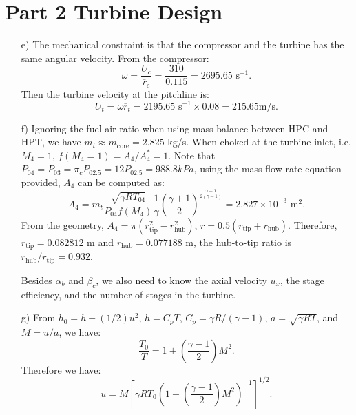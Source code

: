 \documentclass[12pt]{article}
\begin{document}
\section{Part 2 Turbine Design}
\begin{itemize}
	\item[e)]
	The mechanical constraint is that the compressor and the turbine has the same angular velocity. From the compressor:
	\begin{equation}
		\omega = \frac{U_c}{\overline{r}_c} = \frac{310}{0.115} = 2695.65\text{ s}^{-1}.
	\end{equation}
	Then the turbine velocity at the pitchline is:
	\begin{equation}
		U_t = \omega \overline{r}_t = 2195.65\text{ s}^{-1}\times 0.08 = 215.65\text{m/s}.
	\end{equation}
	
	\item[f)]
	Ignoring the fuel-air ratio when using mass balance between HPC and HPT, we have $\dot{m}_t \approx \dot{m}_\text{core}=2.825$ kg/s. When choked at the turbine inlet, i.e. $M_4 = 1$, $f(M_4=1)=A_4/A^*_4=1$. Note that $P_{04} = P_{03} = \pi_c P_{02.5}=12P_{02.5} = 988.8kPa$, using the mass flow rate equation provided, $A_4$ can be computed as:
	\begin{equation}
		A_4 = \dot{m}_t \frac{\sqrt{\gamma R T_{04}}}{P_{04}f(M_4)}\frac{1}{\gamma}\left( \frac{\gamma + 1}{2}\right)^{\frac{\gamma + 1}{2\left( \gamma - 1\right)}} = 2.827\times 10^{-3}\text{ m}^2.
	\end{equation}
	From the geometry, $A_4 = \pi \left(r^2_\text{tip} - r^2_\text{hub}\right)$, $\overline{r} = 0.5\left(r_\text{tip} + r_\text{hub}\right)$. Therefore, $r_\text{tip} = 0.082812$ m and $r_\text{hub} = 0.077188$ m, the hub-to-tip ratio is $r_\text{hub}/r_\text{tip} = 0.932$.
	
	Besides $\alpha_b$ and $\beta_c$, we also need to know the axial velocity $u_x$, the stage efficiency, and the number of stages in the turbine.
	
	\item[g)]
	From $h_0 = h + (1/2) u^2$, $h = C_p T$, $C_p = \gamma R/(\gamma - 1)$, $a = \sqrt{\gamma R T}$, and $M = u / a$, we have:
	\begin{equation}
		\frac{T_0}{T} = 1 + \left(\frac{\gamma - 1}{2}\right) M^2.
	\end{equation}
	Therefore we have:
	\begin{equation}
		u = M \left[\gamma R T_0\left(1 + \left(\frac{\gamma - 1}{2}\right) M^2\right)^{-1}\right]^{1/2}.
		\label{eq:u_M}
	\end{equation}
	

\end{itemize}
\end{document}

